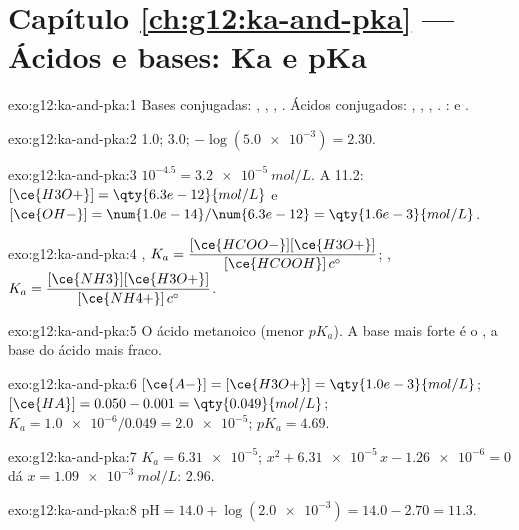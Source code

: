 \section*{Capítulo \ref{ch:g12:ka-and-pka} --- Ácidos e bases: Ka e pKa}

\begin{solution}{exo:g12:ka-and-pka:1}
Bases conjugadas: , , , . Ácidos
conjugados: , , , . :  e .
\end{solution}

\begin{solution}{exo:g12:ka-and-pka:2}
 1.0; 3.0; $-\log(\num{5.0e-3}) = 2.30$.
\end{solution}

\begin{solution}{exo:g12:ka-and-pka:3}
$10^{-4.5} = \qty{3.2e-5}{mol/L}$. A  11.2:
$[\ce{H3O+}] = \qty{6.3e-12}{mol/L}$ e
$[\ce{OH-}] = \num{1.0e-14}/\num{6.3e-12} = \qty{1.6e-3}{mol/L}$.
\end{solution}

\begin{solution}{exo:g12:ka-and-pka:4}
,
$K_a = \dfrac{[\ce{HCOO-}][\ce{H3O+}]}{[\ce{HCOOH}]\,c^\circ}$;
,
$K_a = \dfrac{[\ce{NH3}][\ce{H3O+}]}{[\ce{NH4+}]\,c^\circ}$.
\end{solution}

\begin{solution}{exo:g12:ka-and-pka:5}
O ácido metanoico (menor $pK_a$). A base mais forte é o , a
base do ácido mais fraco.
\end{solution}

\begin{solution}{exo:g12:ka-and-pka:6}
$[\ce{A-}] = [\ce{H3O+}] = \qty{1.0e-3}{mol/L}$;
$[\ce{HA}] = 0.050 - 0.001 = \qty{0.049}{mol/L}$;
$K_a = \num{1.0e-6}/0.049 = \num{2.0e-5}$; $pK_a = 4.69$.
\end{solution}

\begin{solution}{exo:g12:ka-and-pka:7}
$K_a = \num{6.31e-5}$; $x^2 + \num{6.31e-5}\,x - \num{1.26e-6} = 0$ dá
$x = \qty{1.09e-3}{mol/L}$:  2.96.
\end{solution}

\begin{solution}{exo:g12:ka-and-pka:8}
$\mathrm{pH} = 14.0 + \log(\num{2.0e-3}) = 14.0 - 2.70 = 11.3$.
\end{solution}

